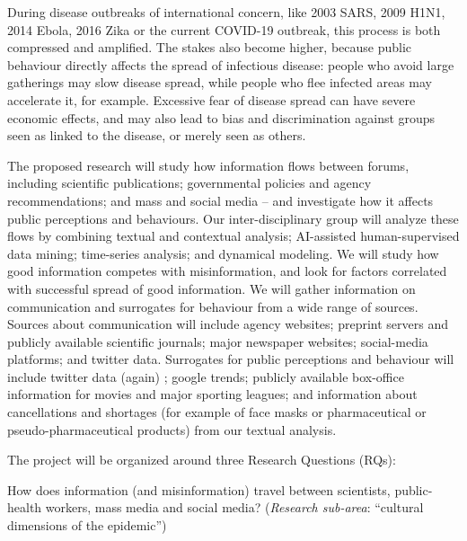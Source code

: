 


During disease outbreaks of international concern, like 2003 SARS, 2009 H1N1, 2014 Ebola, 2016 Zika   or the current COVID-19 outbreak, this process  is both compressed and amplified. The stakes also become higher, because public behaviour directly affects the spread of infectious disease: people who avoid large gatherings may slow disease spread, while people who flee infected areas may accelerate it, for example. Excessive fear of disease spread can have severe economic effects, and may also lead to bias and discrimination against groups seen as linked to the disease, or merely seen as others. 

The proposed research will study how information flows between forums, including scientific publications; governmental policies and agency recommendations; and mass and social media -- and investigate how it affects public perceptions and behaviours. 
Our inter-disciplinary group will analyze these flows by combining textual and contextual analysis; AI-assisted human-supervised data mining; time-series analysis; and dynamical modeling. We will study how good information competes with misinformation, and look for factors correlated with successful spread of good information. 
We will gather information on communication and surrogates for behaviour from a wide range of sources. 
Sources about communication will include agency websites; preprint servers and publicly available scientific journals; major newspaper websites; social-media platforms; and twitter data. 
Surrogates for public perceptions and behaviour will include twitter data (again) ; google trends; publicly available box-office information for movies and major sporting leagues; and information about cancellations and shortages (for example of face masks or pharmaceutical or pseudo-pharmaceutical products) from our textual analysis. 

The project will be organized around three Research Questions (RQs):

 How does information (and misinformation) travel between scientists, public-health workers, mass media and social media? (\emph{Research sub-area}: ``cultural dimensions of the epidemic'') 

